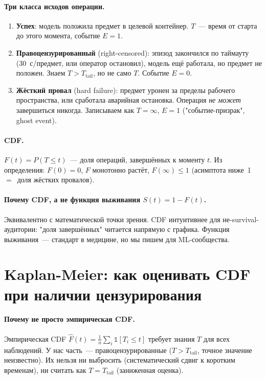 \documentclass[11pt]{article}
\begin{document}
\paragraph{Три класса исходов операции.}
\begin{enumerate}[leftmargin=2em, itemsep=2pt]
\item \textbf{Успех}: модель положила предмет в целевой контейнер. $T$~--- время от старта до этого момента, событие $E=1$.
\item \textbf{Правоцензурированный} (right-censored): эпизод закончился по таймауту (30~с/предмет, или оператор остановил), модель ещё работала, но предмет не положен. Знаем $T > T_{\text{tail}}$, но не само $T$. Событие $E=0$.
\item \textbf{Жёсткий провал} (hard failure): предмет уронен за пределы рабочего пространства, или сработала аварийная остановка. Операция \emph{не может} завершиться никогда. Записываем как $T=\infty$, $E=1$ ("событие-призрак", ghost event).
\end{enumerate}

\paragraph{CDF.} $F(t) = P(T \le t)$~--- доля операций, завершённых к моменту $t$. Из определения: $F(0)=0$, $F$ монотонно растёт, $F(\infty) \le 1$ (асимптота ниже~1~$=$~доля жёстких провалов).

\paragraph{Почему CDF, а не функция выживания $S(t)=1-F(t)$.} Эквивалентно с математической точки зрения. CDF интуитивнее для не-survival-аудитории: "доля завершённых" читается напрямую с графика. Функция выживания~--- стандарт в медицине, но мы пишем для ML-сообщества.

\section{Kaplan-Meier: как оценивать CDF при наличии цензурирования}

\paragraph{Почему не просто эмпирическая CDF.} Эмпирическая CDF $\hat F(t) = \frac{1}{n}\sum_i \mathbb{1}[T_i \le t]$ требует знания $T$ для всех наблюдений. У нас часть~--- правоцензурированные ($T > T_{\text{tail}}$, точное значение неизвестно). Их нельзя ни выбросить (систематический сдвиг к коротким временам), ни считать как $T = T_{\text{tail}}$ (заниженная оценка).
\end{document}
